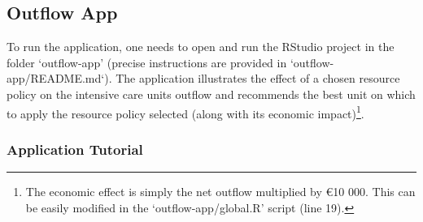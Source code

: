 \documentclass[12pt]{article}
\begin{document}
\subsection*{Outflow App}

To run the application, one needs to open and run the RStudio project in the folder `outflow-app' (precise instructions are provided in `outflow-app/README.md`). The application illustrates the effect of a chosen resource policy on the intensive care units outflow and recommends the best unit on which to apply the resource policy selected (along with its economic impact)\footnote{The economic effect is simply the net outflow multiplied by \euro10 000. This can be easily modified in the `outflow-app/global.R' script (line 19). }. 

\subsubsection*{Application Tutorial}
\end{document}
